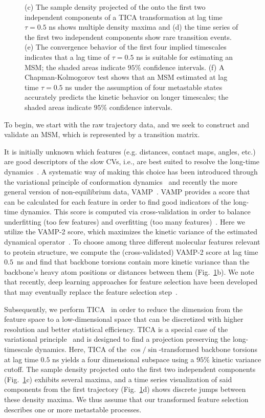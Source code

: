 \documentclass[9pt,tutorial]{livecoms}
\begin{document}
\begin{figure}
{(c) The  sample density projected of the onto the first two independent components of a TICA transformation at lag time $\tau=0.5$ ns shows multiple density maxima and
(d) the time series of the first two independent components show rare transition events.
(e) The convergence behavior of the first four implied timescales indicates that a lag time of $\tau=0.5$ ns is suitable for estimating an MSM;
the shaded areas indicate $95\%$ confidence intervals. (f) A Chapman-Kolmogorov test shows that an MSM estimated at lag time $\tau=0.5$ ns under the assumption of four metastable states accurately predicts the kinetic behavior on longer timescales;
the shaded areas indicate $95\%$ confidence intervals.}
\label{fig:io-to-ck}
\end{figure}

To begin, we start with the raw trajectory data, and we seek to construct and validate an MSM, which is represented by a transition matrix.

It is initially unknown which features (e.g. distances, contact maps, angles, etc.) are good descriptors of the slow CVs, i.e., are best suited to resolve the long-time dynamics~\cite{NoeClementiReview}.
A systematic way of making this choice has been introduced through the variational principle of conformation dynamics~\cite{noe-vac,nueske-vamk} and recently the more general version of non-equilibrium data, VAMP~\cite{vamp-preprint}.
VAMP provides a score that can be calculated for each feature in order to find good indicators of the long-time dynamics.
This score is computed via cross-validation in order to balance underfitting (too few features) and overfitting (too many features)~\cite{gmrq}.
Here we utilize the VAMP-2 score, which maximizes the kinetic variance of the estimated dynamical operator~\cite{kinetic-maps}.
To choose among three different molecular features relevant to protein structure, we compute the (cross-validated) VAMP-2 score at lag time $0.5$~ns and find that backbone torsions contain more kinetic variance than the backbone's heavy atom positions or distances between them (Fig.~\ref{fig:io-to-ck}b).
We note that recently, deep learning approaches for feature selection have been developed that may eventually replace the feature selection step~\cite{vampnet,tae,hernandez-vde}.

Subsequently, we perform TICA~\cite{tica,kinetic-maps} in order to reduce the dimension from the feature space to a low-dimensional space that can be discretized with higher resolution and better statistical efficiency. TICA is a special case of the variational principle~\cite{noe-vac,nueske-vamk} and is designed to find a projection preserving the long-timescale dynamics. Here, TICA of the $\cos/\sin$-transformed backbone torsions at lag time $0.5$ ns yields a four dimensional subspace using a $95\%$ kinetic variance cutoff.
The sample density projected onto the first two independent components (Fig.~\ref{fig:io-to-ck}c) exhibits several maxima, and a time series visualization of said components from the first trajectory (Fig.~\ref{fig:io-to-ck}d) shows discrete jumps between these density maxima.
We thus assume that our transformed feature selection describes one or more metastable processes.
\end{document}
